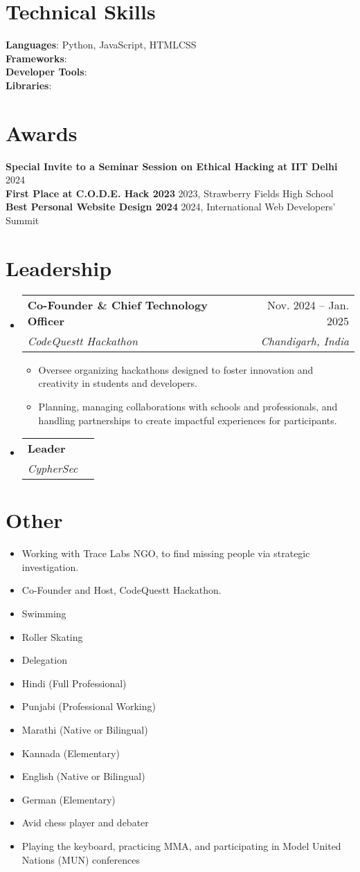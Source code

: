 \documentclass[letterpaper,11pt]{article}
\makeatletter
\newcommand{\resumeItem}[1]{
  \item\small{
    {#1 \vspace{-2pt}}
  }
}
\newcommand{\resumeSubheading}[4]{
  \vspace{-2pt}\item
    \begin{tabular*}{0.97\textwidth}[t]{l@{\extracolsep{\fill}}r}
      \textbf{#1} & #2 \\
      \textit{\small#3} & \textit{\small #4} \\
    \end{tabular*}\vspace{-7pt}
}
\newcommand{\resumeSubHeadingListStart}{\begin{itemize}[leftmargin=0.15in, label={}]}
\newcommand{\resumeSubHeadingListEnd}{\end{itemize}}
\newcommand{\resumeItemListStart}{\begin{itemize}}
\newcommand{\resumeItemListEnd}{\end{itemize}\vspace{-5pt}}
\makeatother
\begin{document}
\section{Technical Skills}
 \begin{itemize}[leftmargin=0.15in, label={}]
    \small{\item{
     \textbf{Languages}{: Python, JavaScript, HTML\/CSS} \\
     \textbf{Frameworks}{: } \\
     \textbf{Developer Tools}{: } \\
     \textbf{Libraries}{: }
    }}
 \end{itemize}

\section{Awards}
 \begin{itemize}[leftmargin=0.15in, label={}]
    \small{\item{
     \textbf{Special Invite to a Seminar Session on Ethical Hacking at IIT Delhi}{ 2024} \\
     \textbf{First Place at C.O.D.E. Hack 2023}{ 2023, Strawberry Fields High School} \\
     \textbf{Best Personal Website Design 2024}{ 2024, International Web Developers' Summit}
    }}
 \end{itemize}

\section{Leadership}
  \resumeSubHeadingListStart
    \resumeSubheading
      {Co-Founder \& Chief Technology Officer}{Nov. 2024 -- Jan. 2025}
      {CodeQuestt Hackathon}{Chandigarh, India}
      \resumeItemListStart
        \resumeItem{Oversee organizing hackathons designed to foster innovation and creativity in students and developers.}
        \resumeItem{Planning, managing collaborations with schools and professionals, and handling partnerships to create impactful experiences for participants.}
      \resumeItemListEnd
    \resumeSubheading
      {Leader}{}
      {CypherSec}{}
  \resumeSubHeadingListEnd

\section{Other}
  \resumeSubHeadingListStart
    \resumeItem{Working with Trace Labs NGO, to find missing people via strategic investigation.}
    \resumeItem{Co-Founder and Host, CodeQuestt Hackathon.}
    \resumeItem{Swimming}
    \resumeItem{Roller Skating}
    \resumeItem{Delegation}
    \resumeItem{Hindi (Full Professional)}
    \resumeItem{Punjabi (Professional Working)}
    \resumeItem{Marathi (Native or Bilingual)}
    \resumeItem{Kannada (Elementary)}
    \resumeItem{English (Native or Bilingual)}
    \resumeItem{German (Elementary)}
    \resumeItem{Avid chess player and debater}
    \resumeItem{Playing the keyboard, practicing MMA, and participating in Model United Nations (MUN) conferences}
  \resumeSubHeadingListEnd
\end{document}
